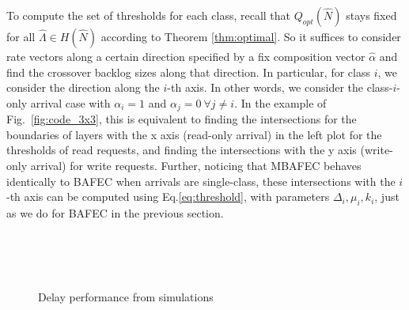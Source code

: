 \documentclass[journal]{IEEEtran}
\newcommand{\nonBlocking}{{BAFEC}\xspace}
\newcommand{\multiclass}{{MBAFEC}\xspace}
\newcommand{\rateVec}{\hat{\Lambda}}
\newcommand{\codeVec}{\hat{N}}
\newcommand{\compVec}{\hat{\alpha}}
\begin{document}
To compute the set of thresholds for each class, recall that $Q_{opt}(\codeVec)$ stays fixed for all $\rateVec\in H(\codeVec)$ according to Theorem \ref{thm:optimal}. So it suffices to consider rate vectors along a certain direction specified by a fix composition vector $\compVec$ and find the crossover backlog sizes along that direction. In particular, for class $i$, we consider the direction along the $i$-th axis. In other words, we consider the class-$i$-only arrival case with $\alpha_i = 1$ and $\alpha_j=0~\forall j\neq i$. In the example of Fig.~\ref{fig:code_3x3}, this is equivalent to finding the 
intersections for the boundaries of layers with the x axis (read-only arrival) in the left plot for the thresholds of read requests, and finding the  intersections with the y axis (write-only arrival) for write requests. Further, noticing that \multiclass behaves identically to \nonBlocking when arrivals are single-class, these intersections with the $i$-th axis can be computed using Eq.\ref{eq:threshold}, with parameters $\Delta_i,\mu_i,k_i$, just as we do  for \nonBlocking in the previous section.



\begin{figure*}[!ht]
\centering
	~~~
~~~
\\
~~~
~~~
\\
~~~
~~~
~~~	
\vspace{-10pt}
\caption{Delay performance from simulations}
\label{fig:multi:delay}
\vspace{-15pt}
\end{figure*}
\end{document}
